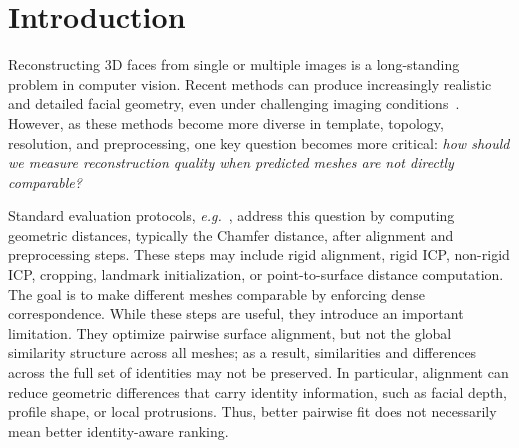 \documentclass[10pt,twocolumn,letterpaper]{article}
\begin{document}
\section{Introduction}
\label{sec:intro}
Reconstructing 3D faces from single or multiple images is a long-standing problem in computer vision. Recent methods can produce increasingly realistic and detailed facial geometry, even under challenging imaging conditions~\cite{3ddfav2, 3di, deca, deep3d, mica, synergynet, emoca, inorig}. However, as these methods become more diverse in template, topology, resolution, and preprocessing, one key question becomes more critical: \emph{how should we measure reconstruction quality when predicted meshes are not directly comparable?}

Standard evaluation protocols, \textit{e.g.}~\cite{now,REALY}, address this question by computing geometric distances, typically the Chamfer distance, after alignment and preprocessing steps. These steps may include rigid alignment, rigid ICP, non-rigid ICP, cropping, landmark initialization, or point-to-surface distance computation. The goal is to make different meshes comparable by enforcing dense correspondence. While these steps are useful, they introduce an important limitation. They optimize pairwise surface alignment, but not the global similarity structure across all meshes; as a result, similarities and differences across the full set of identities may not be preserved. In particular, alignment can reduce geometric differences that carry identity information, such as facial depth, profile shape, or local protrusions. Thus, better pairwise fit does not necessarily mean better identity-aware ranking.
\end{document}
